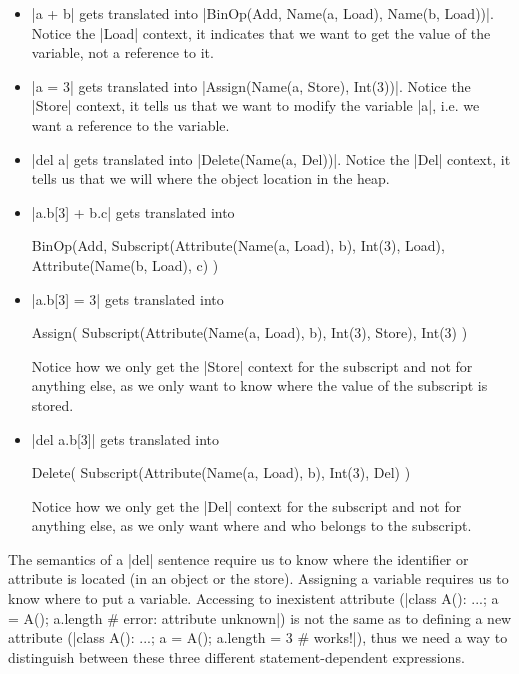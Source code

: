 \begin{itemize}
\item \pycode|a + b| gets translated into
  \pycode|BinOp(Add, Name(a, Load), Name(b, Load))|. Notice the \pycode|Load| context, it
  indicates that we want to get the value of the variable, not a reference to it.
\item \pycode|a = 3| gets translated into
  \pycode|Assign(Name(a, Store), Int(3))|. Notice the \pycode|Store|
  context, it tells us that we want to modify the variable \pycode|a|, i.e. we want a
  reference to the variable.
\item
  \pycode|del a| gets translated into \pycode|Delete(Name(a, Del))|.
  Notice the \pycode|Del| context, it tells us that we will where the object location in
  the heap.
\item
  \pycode|a.b[3] + b.c| gets translated into

\begin{pythoncode}
BinOp(Add,
  Subscript(Attribute(Name(a, Load), b), Int(3), Load),
  Attribute(Name(b, Load), c)
)
\end{pythoncode}
\item
  \pycode|a.b[3] = 3| gets translated into

\begin{pythoncode}
Assign(
  Subscript(Attribute(Name(a, Load), b), Int(3), Store),
  Int(3)
)
\end{pythoncode}

  Notice how we only get the \pycode|Store| context for the subscript
  and not for anything else, as we only want to know where the value of
  the subscript is stored.
\item
  \pycode|del a.b[3]| gets translated into

\begin{pythoncode}
Delete(
  Subscript(Attribute(Name(a, Load), b), Int(3), Del)
)
\end{pythoncode}

  Notice how we only get the \pycode|Del| context for the subscript and
  not for anything else, as we only want where and who belongs to the
  subscript.
\end{itemize}

The semantics of a \pycode|del| sentence require us
to know where the identifier or attribute is located (in an object or
the store). Assigning a variable requires us to know where to put a
variable. Accessing to inexistent attribute
(\pycode|class A(): ...; a = A(); a.length # error: attribute unknown|)
is not the same as to defining a new attribute
(\pycode|class A(): ...; a = A(); a.length = 3 # works!|),
thus we need a way to distinguish between these three different
statement-dependent expressions.


